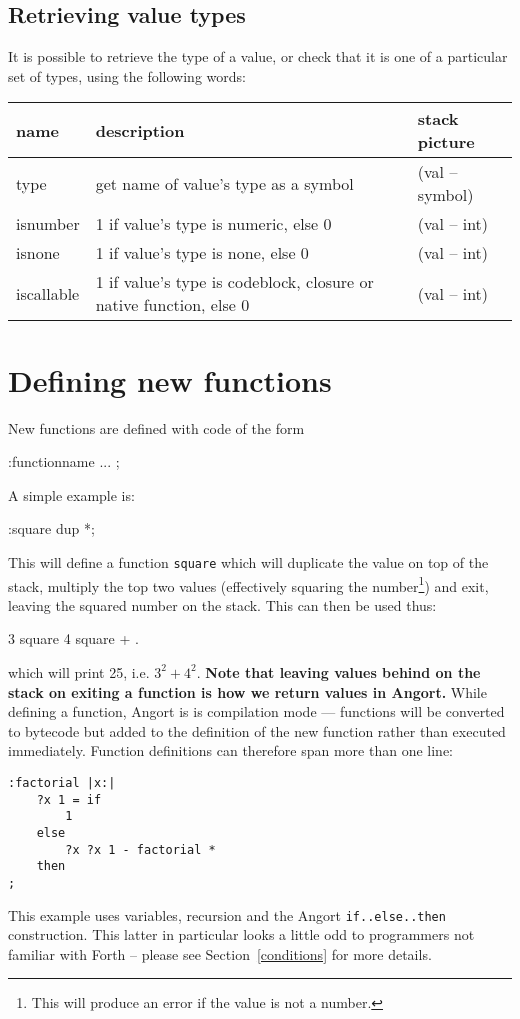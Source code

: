 \subsection{Retrieving value types}
\label{typechecking}
It is possible to retrieve the type of a value, or check that it is
one of a particular set of types, using the following words:
\begin{center}
\begin{tabular}{|l|p{4in}|l|}\hline
\textbf{name} & \textbf{description} & \textbf{stack picture}\\ \hline
type & get name of value's type as a symbol & (val -- symbol)\\
isnumber & 1 if value's type is numeric, else 0 & (val -- int)\\
isnone & 1 if value's type is none, else 0 & (val -- int)\\
iscallable & 1 if value's type is codeblock, closure or native function, else 0 & (val -- int)\\
\hline
\end{tabular}
\end{center}

\clearpage
\section{Defining new functions}
New functions are defined with code of the form
\begin{v}
:functionname ... ;
\end{v}
A simple example is:
\begin{v}
:square dup *;
\end{v}
This will define a function \texttt{square} which will duplicate
the value on top of the stack, multiply the top two values
(effectively squaring the number\footnote{This will produce
an error if the value is not a number.}) and exit, leaving the
squared number on the stack. This can then be used thus:
\begin{v}
3 square 4 square + .
\end{v}
which will print 25, i.e. $3^2+4^2$. \textbf{Note that leaving values behind
on the stack on exiting a function is how we return values in Angort.}
While defining a function, Angort is is compilation mode --- functions will
be converted to bytecode but added to the definition of the new function
rather than executed immediately. Function definitions can therefore span
more than one line:
\begin{lstlisting}
:factorial |x:|
    ?x 1 = if
        1
    else
        ?x ?x 1 - factorial *
    then
;  
\end{lstlisting}
This example uses variables, recursion and the Angort \texttt{if..else..then} construction.
This latter in particular looks a little odd to programmers not familiar with Forth -- please
see Section~\ref{conditions} for more details.


